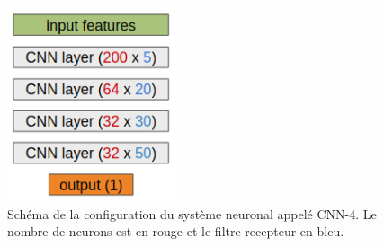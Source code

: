 \begin{figure}[thb]
  \centering
    \includegraphics[width=5cm]{./Chapitre5/figures/CNN.png}
    \caption{Schéma de la configuration du système neuronal appelé CNN-4. Le nombre de neurons est en rouge et le filtre recepteur en bleu.}
    \label{fig:CNN}
\end{figure}
